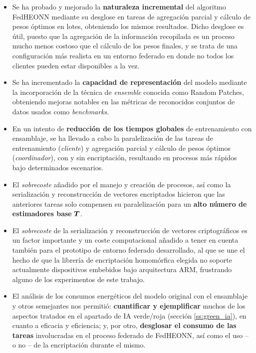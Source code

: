 \documentclass[00-Trabajo_Final.tex]{subfiles}
\begin{document}
\begin{itemize}[topsep=2pt, itemsep=2pt]
    \item Se ha probado y mejorado la \textbf{naturaleza incremental} del algoritmo FedHEONN mediante su desglose en tareas de agregación parcial y cálculo de pesos óptimos en lotes, obteniendo los mismos resultados. Dicho desglose es útil, puesto que la agregación de la información recopilada es un proceso mucho menos costoso que el cálculo de los pesos finales, y se trata de una configuración más realista en un entorno federado en donde no todos los clientes pueden estar disponibles a la vez.
    \item Se ha incrementado la \textbf{capacidad de representación} del modelo mediante la incorporación de la técnica de \textit{ensemble} conocida como Random Patches, obteniendo mejoras notables en las métricas de reconocidos conjuntos de datos usados como \textit{benchmarks}.
    \item En un intento de \textbf{reducción de los tiempos globales} de entrenamiento con ensamblaje, se ha llevado a cabo la paralelización de las tareas de entrenamiento (\textit{cliente}) y agregación parcial y cálculo de pesos óptimos (\textit{coordinador}), con y sin encriptación, resultando en procesos más rápidos bajo determinados escenarios.
    \item El \textit{sobrecoste} añadido por el manejo y creación de procesos, así como la serialización y reconstrucción de vectores encriptados hicieron que las anteriores tareas solo compensen su paralelización para un \textbf{alto número de estimadores base} $\boldsymbol{T}$.
    \item El \textit{sobrecoste} de la serialización y reconstrucción de vectores criptográficos es un factor importante y un coste computacional añadido a tener en cuenta también para el prototipo de entorno federado desarrollado, al que se une el hecho de que la librería de encriptación homomórfica elegida no soporte actualmente dispositivos embebidos bajo arquitectura ARM, frustrando alguno de los experimentos de este trabajo.
    \item El análisis de los consumos energéticos del modelo original con el ensamblaje y otros semejantes nos permitió: \textbf{cuantificar y ejemplificar} muchos de los aspectos tratados en el apartado de IA verde/roja (sección \ref{ss:green_ia}), en cuanto a eficacia y eficiencia; y, por otro, \textbf{desglosar el consumo de las tareas} involucradas en el proceso federado de FedHEONN, así como el uso{ }--{ }o no{ }--{ }de la encriptación durante el mismo.
\end{itemize}
\end{document}
